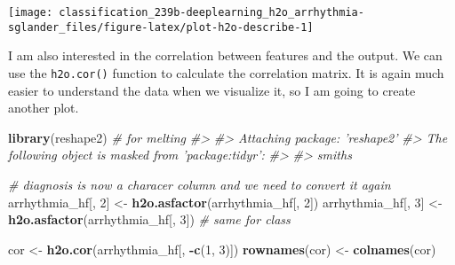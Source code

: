 \documentclass[]{book}
\newenvironment{Shaded}{\begin{snugshade}}{\end{snugshade}}
\newcommand{\CommentTok}[1]{\textcolor[rgb]{0.56,0.35,0.01}{\textit{#1}}}
\newcommand{\DecValTok}[1]{\textcolor[rgb]{0.00,0.00,0.81}{#1}}
\newcommand{\KeywordTok}[1]{\textcolor[rgb]{0.13,0.29,0.53}{\textbf{#1}}}
\newcommand{\NormalTok}[1]{#1}
\newcommand{\OperatorTok}[1]{\textcolor[rgb]{0.81,0.36,0.00}{\textbf{#1}}}
\newcommand{\StringTok}[1]{\textcolor[rgb]{0.31,0.60,0.02}{#1}}
\begin{document}
\begin{center}\texttt{[image: classification\_239b-deeplearning\_h2o\_arrhythmia-sglander\_files/figure-latex/plot-h2o-describe-1]} \end{center}

I am also interested in the correlation between features and the output. We can use the \texttt{h2o.cor()} function to calculate the correlation matrix. It is again much easier to understand the data when we visualize it, so I am going to create another plot.\\

\begin{Shaded}
\begin{Highlighting}[]
\KeywordTok{library}\NormalTok{(reshape2) }\CommentTok{# for melting}
\CommentTok{#> }
\CommentTok{#> Attaching package: 'reshape2'}
\CommentTok{#> The following object is masked from 'package:tidyr':}
\CommentTok{#> }
\CommentTok{#>     smiths}

\CommentTok{# diagnosis is now a characer column and we need to convert it again}
\NormalTok{arrhythmia_hf[, }\DecValTok{2}\NormalTok{] <-}\StringTok{ }\KeywordTok{h2o.asfactor}\NormalTok{(arrhythmia_hf[, }\DecValTok{2}\NormalTok{]) }
\NormalTok{arrhythmia_hf[, }\DecValTok{3}\NormalTok{] <-}\StringTok{ }\KeywordTok{h2o.asfactor}\NormalTok{(arrhythmia_hf[, }\DecValTok{3}\NormalTok{]) }\CommentTok{# same for class}

\NormalTok{cor <-}\StringTok{ }\KeywordTok{h2o.cor}\NormalTok{(arrhythmia_hf[, }\OperatorTok{-}\KeywordTok{c}\NormalTok{(}\DecValTok{1}\NormalTok{, }\DecValTok{3}\NormalTok{)])}
\KeywordTok{rownames}\NormalTok{(cor) <-}\StringTok{ }\KeywordTok{colnames}\NormalTok{(cor)}


\end{Highlighting}
\end{Shaded}
\end{document}
